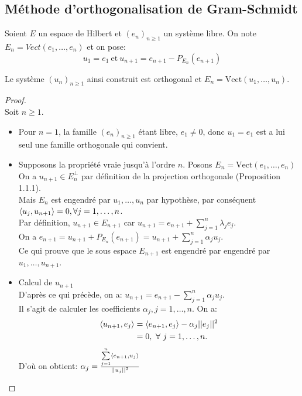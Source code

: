 \subsection{Méthode d'orthogonalisation de Gram-Schmidt}
Soient $E$ un espace de Hilbert et $(e_n)_{n \geqslant 1}$ un système libre. On note $ E_n = Vect( e_1 , \dots, e_n)$ et on pose: $$ u_1 = e_1 \ \text{et}\ u_{n+1} = e_{n+1} - P_{E_n}(e_{n+1})$$

\bprop
$ $\\Le système $(u_n)_{n \geqslant 1}$ ainsi construit est orthogonal et $E_n=\text{Vect}(u_1, \dots, u_n )$.
\eprop

\begin{proof}
$ $\\Soit $n\geqslant 1$.
\begin{itemize}
\item Pour $n=1$, la famille $(e_n)_{n \geqslant 1}$ étant libre, $e_1 \neq 0$, donc $u_1 = e_1$ est a lui seul une famille orthogonale qui convient.

\item Supposons la propriété vraie jusqu'à l'ordre $n$. Posons $ E_n = \text{Vect}( e_1 , \dots, e_n)$ 
\\On a $u_{n+1} \in E_n^ \perp $ par définition de la projection orthogonale (Proposition 1.1.1).
\\Mais $E_n$ est engendré par $ u_1 , \dots, u_n $ par hypothèse, par conséquent \\$\langle u_j,u_{n+1} \rangle = 0, \forall j=1, \dots, n$.
\\Par définition, $u_{n+1} \in E_{n+1}$ car $u_{n+1}= e_{n+1}+\sum\limits_{j=1}^n \lambda_j e_j$.
\\On a $e_{n+1} = u_{n+1}+P_{E_n}(e_{n+1}) = u_{n+1}+\sum\limits_{j=1}^n \alpha_j u_j$.
\\Ce qui prouve que le sous espace $E_{n+1}$ est engendré par engendré par $ u_1 , \dots, u_{n+1} $.
 
\item Calcul de $u_{n+1}$
\\D'après ce qui précède, on a: $u_{n+1}=e_{n+1}-\sum\limits_{j=1}^n \alpha_j u_j$.
\\Il s'agit de calculer les coefficients $\alpha_j, j=1,\dots,n$. On a:
\begin{align*}
\langle u_{n+1},e_j \rangle &= \langle e_{n+1},e_j \rangle - \alpha_j ||e_j||^2 \\
&=0, \ \forall \ j=1,\dots, n.
\end{align*}
D'où on obtient: $\alpha_j=\frac{ \sum \limits_{j=1}^{n}\langle e_{n+1} , u_j \rangle}{ || u_j ||^2}$
\end{itemize}
\end{proof}

